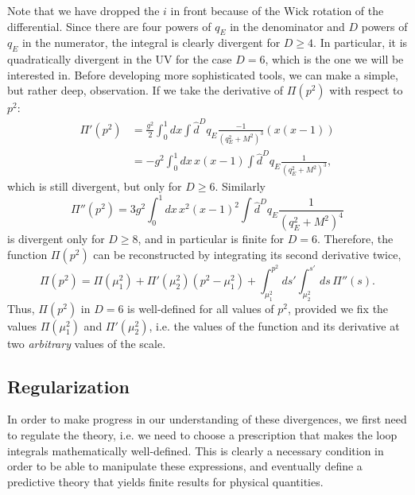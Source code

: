 \documentclass{article}
\numberwithin{equation}{section}
\begin{document}
Note that we have dropped the $i$ in front because of the Wick rotation of the differential. Since there are four powers of $q_E$ in the denominator and $D$ powers of $q_E$ in the numerator, the integral is clearly divergent for $D \geq 4$. In particular, it is quadratically divergent in the UV for the case $D=6$, which is the one we will be interested in. Before developing more sophisticated tools, we can make a simple, but rather deep, observation. If we take the derivative of $\Pi(p^2)$ with respect to $p^2$:
\begin{equation}
\begin{aligned}
    \Pi'(p^2) &= \frac{g^2}{2} \int_0^1 dx \int \hat{d}^Dq_E \frac{-1}{(q_E^2 + M^2)^3} \left(x(x-1)\right) \\
    &= -g^2 \int_0^1 dx\, x(x-1) \int \hat{d}^Dq_E \frac{1}{(q_E^2 +M^2)^3},
\end{aligned}
\end{equation}
which is still divergent, but only for $D\geq 6$. Similarly
\begin{equation}
    \Pi''(p^2) = 3g^2 \int_0^1 dx\, x^2(x-1)^2 \int \hat{d}^Dq_E \frac{1}{(q_E^2 + M^2)^4}
\end{equation}
is divergent only for $D\geq 8$, and in particular is finite for $D=6$. Therefore, the function $\Pi(p^2)$ can be reconstructed by integrating its second derivative twice,
\begin{equation}
    \Pi(p^2) = \Pi(\mu_1^2) + \Pi'(\mu_2^2)(p^2 - \mu_1^2) + \int_{\mu_1^2}^{p^2} ds' \int_{\mu_2^2}^{s'} ds\, \Pi''(s).
\end{equation}
Thus, $\Pi(p^2)$ in $D=6$ is well-defined for all values of $p^2$, provided we fix the values $\Pi(\mu_1^2)$ and $\Pi'(\mu_2^2)$, i.e. the values of the function and its derivative at two \textit{arbitrary} values of the scale.

\subsection{Regularization}

In order to make progress in our understanding of these divergences, we first need to regulate the theory, i.e. we need to choose a prescription that makes the loop integrals mathematically well-defined. This is clearly a necessary condition in order to be able to manipulate these expressions, and eventually define a predictive theory that yields finite results for physical quantities. 
\end{document}
